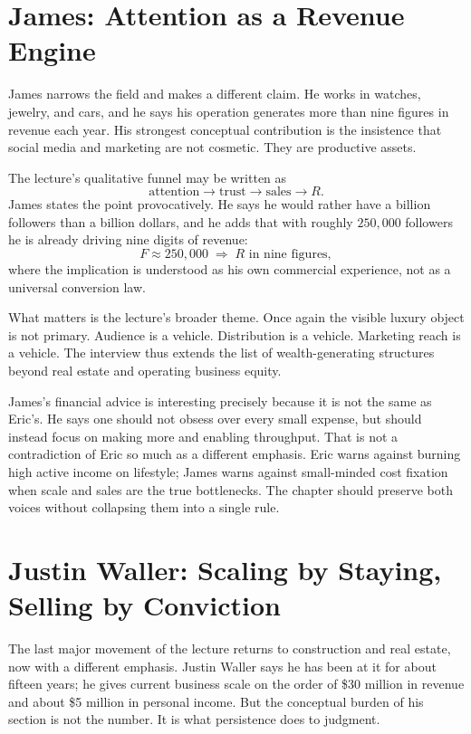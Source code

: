 \section{James: Attention as a Revenue Engine}

James narrows the field and makes a different claim. He works in watches, jewelry, and cars, and he says his operation generates more than nine figures in revenue each year. His strongest conceptual contribution is the insistence that social media and marketing are not cosmetic. They are productive assets.

The lecture's qualitative funnel may be written as
\begin{equation}
\text{attention} \longrightarrow \text{trust} \longrightarrow \text{sales} \longrightarrow R.
\end{equation}
James states the point provocatively. He says he would rather have a billion followers than a billion dollars, and he adds that with roughly \(250{,}000\) followers he is already driving nine digits of revenue:
\begin{equation}
F \approx 250{,}000 \;\Longrightarrow\; R \text{ in nine figures},
\end{equation}
where the implication is understood as his own commercial experience, not as a universal conversion law.

What matters is the lecture's broader theme. Once again the visible luxury object is not primary. Audience is a vehicle. Distribution is a vehicle. Marketing reach is a vehicle. The interview thus extends the list of wealth-generating structures beyond real estate and operating business equity.

James's financial advice is interesting precisely because it is not the same as Eric's. He says one should not obsess over every small expense, but should instead focus on making more and enabling throughput. That is not a contradiction of Eric so much as a different emphasis. Eric warns against burning high active income on lifestyle; James warns against small-minded cost fixation when scale and sales are the true bottlenecks. The chapter should preserve both voices without collapsing them into a single rule.

\section{Justin Waller: Scaling by Staying, Selling by Conviction}

The last major movement of the lecture returns to construction and real estate, now with a different emphasis. Justin Waller says he has been at it for about fifteen years; he gives current business scale on the order of \$30 million in revenue and about \$5 million in personal income. But the conceptual burden of his section is not the number. It is what persistence does to judgment.

